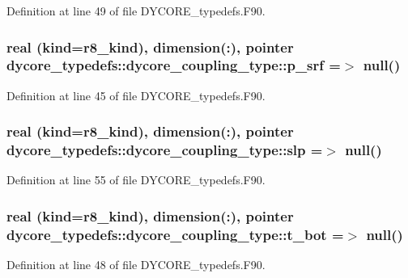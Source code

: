 Definition at line 49 of file D\-Y\-C\-O\-R\-E\-\_\-typedefs.\-F90.

\subsubsection[{p\-\_\-srf}]{\setlength{\rightskip}{0pt plus 5cm}real (kind=r8\-\_\-kind), dimension(\-:), pointer dycore\-\_\-typedefs\-::dycore\-\_\-coupling\-\_\-type\-::p\-\_\-srf =$>$ null()}\label{structdycore__typedefs_1_1dycore__coupling__type_a8bdc2008232e57dff5cf7382c500f02e}


Definition at line 45 of file D\-Y\-C\-O\-R\-E\-\_\-typedefs.\-F90.

\subsubsection[{slp}]{\setlength{\rightskip}{0pt plus 5cm}real (kind=r8\-\_\-kind), dimension(\-:), pointer dycore\-\_\-typedefs\-::dycore\-\_\-coupling\-\_\-type\-::slp =$>$ null()}\label{structdycore__typedefs_1_1dycore__coupling__type_ac11a4dc51ade2f678aa2511deaa0695a}


Definition at line 55 of file D\-Y\-C\-O\-R\-E\-\_\-typedefs.\-F90.

\subsubsection[{t\-\_\-bot}]{\setlength{\rightskip}{0pt plus 5cm}real (kind=r8\-\_\-kind), dimension(\-:), pointer dycore\-\_\-typedefs\-::dycore\-\_\-coupling\-\_\-type\-::t\-\_\-bot =$>$ null()}\label{structdycore__typedefs_1_1dycore__coupling__type_a35bdfaa15f9d5b7b151ae2804bb52149}


Definition at line 48 of file D\-Y\-C\-O\-R\-E\-\_\-typedefs.\-F90.

